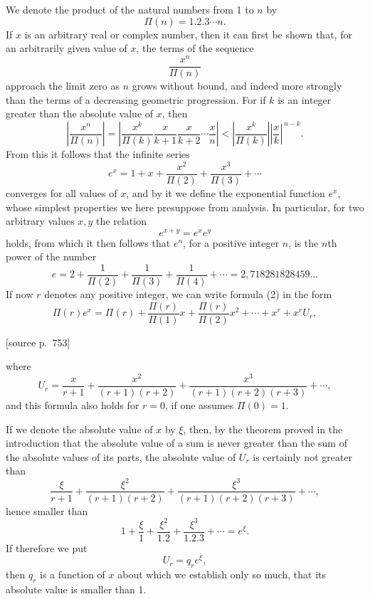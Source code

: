 \documentclass[11pt]{article}
\newcommand{\srcpage}[1]{\par\medskip\noindent\textsf{[source p.~#1]}\par\smallskip}
\begin{document}
We denote the product of the natural numbers from 1 to $n$ by
\[
\Pi(n)=1.2.3\cdots n.
\]
If $x$ is an arbitrary real or complex number, then it can first be shown that, for an arbitrarily given value of $x$, the terms of the sequence
\begin{equation}\tag{1}
\frac{x^n}{\Pi(n)}
\end{equation}
approach the limit zero as $n$ grows without bound, and indeed more strongly than the terms of a decreasing geometric progression. For if $k$ is an integer greater than the absolute value of $x$, then
\[
\left|\frac{x^n}{\Pi(n)}\right|
=
\left|\frac{x^k}{\Pi(k)}\frac{x}{k+1}\frac{x}{k+2}\cdots\frac{x}{n}\right|
<
\left|\frac{x^k}{\Pi(k)}\right|\left|\frac{x}{k}\right|^{\,n-k}.
\]
From this it follows that the infinite series
\begin{equation}\tag{2}
e^x=1+x+\frac{x^2}{\Pi(2)}+\frac{x^3}{\Pi(3)}+\cdots
\end{equation}
converges for all values of $x$, and by it we define the exponential function $e^x$, whose simplest properties we here presuppose from analysis. In particular, for two arbitrary values $x,y$ the relation
\[
e^{x+y}=e^x e^y
\]
holds, from which it then follows that $e^n$, for a positive integer $n$, is the $n$th power of the number
\begin{equation}\tag{3}
e=2+\frac1{\Pi(2)}+\frac1{\Pi(3)}+\frac1{\Pi(4)}+\cdots
=2{,}718281828459\ldots
\end{equation}
If now $r$ denotes any positive integer, we can write formula (2) in the form
\begin{equation}\tag{4}
\Pi(r)e^x=\Pi(r)+\frac{\Pi(r)}{\Pi(1)}x+\frac{\Pi(r)}{\Pi(2)}x^2+\cdots+x^r+x^rU_r,
\end{equation}
\srcpage{753}
where
\begin{equation}\tag{5}
U_r=\frac{x}{r+1}+\frac{x^2}{(r+1)(r+2)}+\frac{x^3}{(r+1)(r+2)(r+3)}+\cdots,
\end{equation}
and this formula also holds for $r=0$, if one assumes $\Pi(0)=1$.

If we denote the absolute value of $x$ by $\xi$, then, by the theorem proved in the introduction that the absolute value of a sum is never greater than the sum of the absolute values of its parts, the absolute value of $U_r$ is certainly not greater than
\[
\frac{\xi}{r+1}
+\frac{\xi^2}{(r+1)(r+2)}
+\frac{\xi^3}{(r+1)(r+2)(r+3)}
+\cdots,
\]
hence smaller than
\[
1+\frac{\xi}{1}+\frac{\xi^2}{1.2}+\frac{\xi^3}{1.2.3}+\cdots=e^\xi.
\]
If therefore we put
\[
U_r=q_re^\xi,
\]
then $q_r$ is a function of $x$ about which we establish only so much, that its absolute value is smaller than 1.
\end{document}
